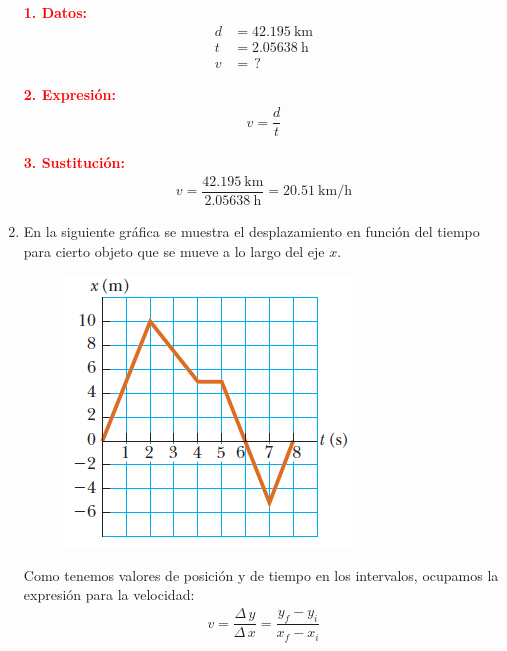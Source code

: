 \documentclass[14pt]{extarticle}
\newcommand{\textocolor}[2]{\textbf{\textcolor{#1}{#2}}}
\begin{document}
\begin{enumerate}
\begin{minipage}[t]{0.4\linewidth}
\textocolor{red}{1. Datos:}
\begin{align*}
d &= \SI{42.195}{\kilo\meter} \\
t &= \SI{2.05638}{\hour} \\
v &= \, ?
\end{align*}
\end{minipage}
\hspace{1cm}
\begin{minipage}[t]{0.4\linewidth}
\textocolor{red}{2. Expresión:}
\begin{align*}
v = \dfrac{d}{t}
\end{align*}
\end{minipage}

\textocolor{red}{3. Sustitución:}
\begin{align*}
v = \dfrac{\SI{42.195}{\kilo\meter}}{\SI{2.05638}{\hour}} = \SI[per-mode=fraction]{20.51}{\kilo\meter\per\hour}
\end{align*}
    
\item En la siguiente gráfica se muestra el desplazamiento en función del tiempo para cierto objeto que se mueve a lo largo del eje $x$.
\begin{figure}[H]
    \centering
    \includegraphics[scale=1]{Imagenes/Ejercicio_Cuenta_01.png}
\end{figure}
Como tenemos valores de posición y de tiempo en los intervalos, ocupamos la expresión para la velocidad:
\begin{align*}
v = \dfrac{\Delta \, y}{\Delta \, x} = \dfrac{y_{f} - y_{i}}{x_{f} - x_{i}}
\end{align*}


\end{enumerate}
\end{document}

